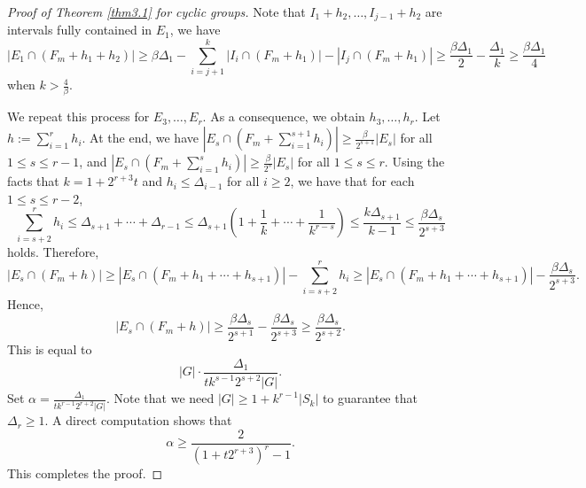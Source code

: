 \documentclass[11pt]{article}
\newtheorem{remark}[theorem]{Remark}
\theoremstyle{definition}
\begin{document}
\begin{proof}[Proof of Theorem \ref{thm3.1} for cyclic groups]
Note that $I_1+h_2, \ldots, I_{j-1}+h_2$ are intervals fully contained in $E_1$, we have
\[|E_1\cap (F_m+h_1+h_2)|\ge \beta \Delta_1-
\sum_{i=j+1}^k|I_{i}\cap (F_m+h_1)|-|I_j\cap (F_m+h_1)|\ge
\frac{\beta\Delta_1}{2}-\frac{\Delta_1}{k}\ge \frac{\beta\Delta_1}{4}\] when $k>\frac{4}{\beta}$. 

We repeat this process for $E_3,\ldots, E_r$. As a consequence, we obtain $h_3, \ldots, h_r$. Let $h:=\sum_{i=1}^rh_i$. At the end, we have $|E_s\cap (F_m+\sum_{i=1}^{s+1} h_i)|\ge \frac{\beta}{2^{s+1}}|E_s|$ for all $1\le s\le r-1$, and $|E_s\cap (F_m+\sum_{i=1}^{s} h_i)|\ge \frac{\beta}{2^{s}}|E_s|$ for all $1\le s\le r$.
Using the facts that $k= 1 + 2^{r+3} t$ and $h_i\le \Delta_{i-1}$ for all $i\ge 2$, we have that for each $1\le s\le r-2$,
\[\sum_{i=s+2}^rh_i\le \Delta_{s+1}+\cdots+\Delta_{r-1}\le \Delta_{s+1}\left(1+\frac{1}{k}+\cdots+\frac{1}{k^{r-s}}\right)\le \frac{k\Delta_{s+1}}{k-1}\le \frac{\beta\Delta_s}{2^{s+3}}\]
holds. Therefore,
\[|E_s\cap (F_m+h)|\ge|E_s\cap (F_m+h_1+\cdots+h_{s+1})|-\sum_{i=s+2}^rh_i \ge |E_s\cap (F_m+h_1+\cdots+h_{s+1})|-\frac{\beta\Delta_s}{2^{s+3}}.\]
Hence,
\[|E_s\cap (F_m+h)|\ge  \frac{\beta\Delta_s}{2^{s+1}}-\frac{\beta\Delta_s}{2^{s+3}}\ge \frac{\beta \Delta_s}{2^{s+2}}.\]
This is equal to\[|G|\cdot \frac{\Delta_1}{tk^{s-1}2^{s+2}|G|}.\]
Set $\alpha=\frac{\Delta_1}{tk^{r-1}2^{r+2}|G|}$. Note that we need $|G|\ge 1+k^{r-1}|S_k|$ to guarantee that $\Delta_r\ge 1$. A direct computation shows that 
\[\alpha \ge \frac{2}{(1+t2^{r+3})^r-1}.\]
This completes the proof.
\end{proof}
\end{document}
